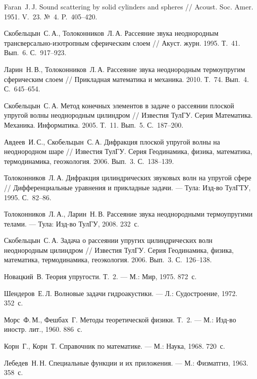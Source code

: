 \newpage

\begin{thebibliography}{99}

Faran~J.\,J. Sound scattering by solid cylinders and spheres // Acoust. Soc. Amer. 1951. V.~23. №~4. P.~405--420.

Скобельцын~С.\,А., Толоконников~Л.\,А. Рассеяние звука неоднородным трансверсально-изотропным сферическим слоем // Акуст. журн. 1995. Т.~41. Вып.~6. С.~917--923.

Ларин~Н.\,В., Толоконников~Л.\,А. Рассеяние звука неоднородным термоупругим сферическим слоем // Прикладная математика и механика. 2010. Т.~74. Вып.~4. С.~645--654.

Скобельцын~С.\,А. Метод конечных элементов в задаче о рассеянии плоской упругой волны неоднородным цилиндром // Известия ТулГУ. Серия Математика. Механика. Информатика. 2005. Т.~11. Вып.~5. С.~187--200.

Авдеев~И.\,С., Скобельцын~С.\,А. Дифракция плоской упругой волны на неоднородном шаре // Известия ТулГУ. Серия Геодинамика, физика, математика, термодинамика, геоэкология. 2006. Вып.~3. С.~138--139.

Толоконников~Л.\,А. Дифракция цилиндрических звуковых волн на упругой сфере // Дифференциальные уравнения и прикладные задачи. --- Тула: Изд-во ТулГТУ, 1995. С.~82--86.

Толоконников~Л.\,А., Ларин~Н.\,В. Рассеяние звука неоднородными термоупругими телами. --- Тула: Изд-во ТулГУ, 2008. 232~с.

Скобельцын~С.\,А. Задача о рассеянии упругих цилиндрических волн неоднородным цилиндром // Известия ТулГУ. Серия Геодинамика, физика, математика, термодинамика, геоэкология. 2006. Вып.~3. С.~126--138.

Новацкий~В. Теория упругости. Т.~2. --- М.: Мир, 1975. 872~с.

Шендеров~Е.\,Л. Волновые задачи гидроакустики. --- Л.: Судостроение, 1972. 352~с.

Морс~Ф.\,М., Фешбах~Г. Методы теоретической физики. Т.~2. --- М.: Изд-во иностр. лит., 1960. 886~с.

Корн~Г., Корн~Т. Справочник по математике. --- М.: Наука, 1968. 720~с.






Лебедев~Н.\,Н. Специальные функции и их приложения. --- М.: Физматгиз, 1963. 358~с.







\end{thebibliography}